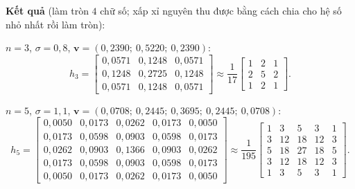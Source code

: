 \textbf{Kết quả} (làm tròn $4$ chữ số; xấp xỉ nguyên thu được bằng cách chia cho hệ số nhỏ nhất rồi làm tròn):

$n = 3$, $\sigma = 0{,}8$, $\mathbf{v} = (0{,}2390;\ 0{,}5220;\ 0{,}2390)$:
\[
h_3 = \begin{bmatrix} 0{,}0571 & 0{,}1248 & 0{,}0571 \\ 0{,}1248 & 0{,}2725 & 0{,}1248 \\ 0{,}0571 & 0{,}1248 & 0{,}0571 \end{bmatrix}
\approx \frac{1}{17}\begin{bmatrix} 1 & 2 & 1 \\ 2 & 5 & 2 \\ 1 & 2 & 1 \end{bmatrix}.
\]

$n = 5$, $\sigma = 1{,}1$, $\mathbf{v} = (0{,}0708;\ 0{,}2445;\ 0{,}3695;\ 0{,}2445;\ 0{,}0708)$:
\[
h_5 = \begin{bmatrix}
0{,}0050 & 0{,}0173 & 0{,}0262 & 0{,}0173 & 0{,}0050 \\
0{,}0173 & 0{,}0598 & 0{,}0903 & 0{,}0598 & 0{,}0173 \\
0{,}0262 & 0{,}0903 & 0{,}1366 & 0{,}0903 & 0{,}0262 \\
0{,}0173 & 0{,}0598 & 0{,}0903 & 0{,}0598 & 0{,}0173 \\
0{,}0050 & 0{,}0173 & 0{,}0262 & 0{,}0173 & 0{,}0050
\end{bmatrix}
\approx \frac{1}{195}\begin{bmatrix}
1 & 3 & 5 & 3 & 1 \\ 3 & 12 & 18 & 12 & 3 \\ 5 & 18 & 27 & 18 & 5 \\ 3 & 12 & 18 & 12 & 3 \\ 1 & 3 & 5 & 3 & 1
\end{bmatrix}.
\]

